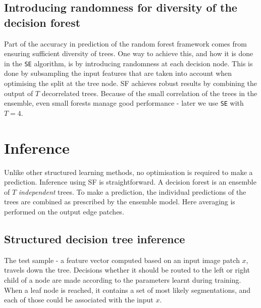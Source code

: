 \subsection{Introducing randomness for diversity of the decision forest}
Part of the accuracy in prediction of the random forest framework comes from ensuring sufficient diversity of trees. One way to achieve this, and how it is done in the {\tt SE} algorithm, is by introducing randomness at each decision node. This is done by subsampling the input features that are taken into account when optimising the split at the tree node. SF achieves robust results by combining the output of $T$ decorrelated trees. Because of the small correlation of the trees in the ensemble, even small forests manage good performance - later we use {\tt SE} with $T=4$.

\section{Inference}
Unlike other structured learning methods, no optimisation is required to make a prediction. Inference using SF is straightforward. A decision forest is an ensemble of $T$ \textit{independent} trees. To make a prediction, the individual predictions of the trees are combined as prescribed by the ensemble model. Here averaging is performed on the output edge patches.

\subsection{Structured decision tree inference}
\label{sec:ch2-structured-forest-inference}
The test sample - a feature vector computed based on an input image patch $x$, travels down the tree. Decisions whether it should be routed to the left or right child of a node are made according to the parameters learnt during training. When a leaf node is reached, it contains a set of most likely segmentations, and each of those could be associated with the input $x$.

